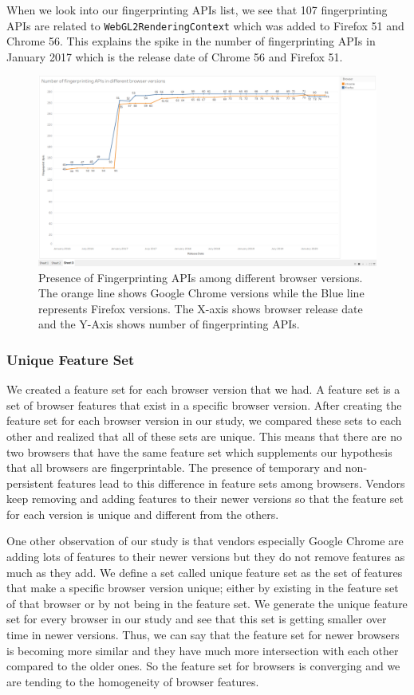 When we look into our fingerprinting APIs list, we see that 107 fingerprinting APIs are related to \texttt{WebGL2RenderingContext} which was added to Firefox 51 and Chrome 56. This explains the spike in the number of fingerprinting APIs in January 2017 which is the release date of Chrome 56 and Firefox 51. 

\begin{figure}[ht]
    \centering
    \includegraphics[width=\textwidth]{figures/Fingerprinting-APIs.png}
    \caption{Presence of Fingerprinting APIs among different browser versions. The orange line shows Google Chrome versions while the Blue line represents Firefox versions. The X-axis shows browser release date and the Y-Axis shows number of fingerprinting APIs.}
    \label{fig:fingerprint-apis}
\end{figure}

\subsubsection{Unique Feature Set}
We created a feature set for each browser version that we had.
A feature set is a set of browser features that exist in a specific browser version.
After creating the feature set for each browser version in our study, we compared these sets to each other and realized that all of these sets are unique.
This means that there are no two browsers that have the same feature set which supplements our hypothesis that all browsers are fingerprintable. The presence of temporary and non-persistent features lead to this difference in feature sets among browsers. Vendors keep removing and adding features to their newer versions so that the feature set for each version is unique and different from the others.

One other observation of our study is that vendors especially Google Chrome are adding lots of features to their newer versions but they do not remove features as much as they add. We define a set called unique feature set as the set of features that make a specific browser version unique; either by existing in the feature set of that browser or by not being in the feature set. We generate the unique feature set for every browser in our study and see that this set is getting smaller over time in newer versions. Thus, we can say that the feature set for newer browsers is becoming more similar and they have much more intersection with each other compared to the older ones. So the feature set for browsers is converging and we are tending to the homogeneity of browser features. 

